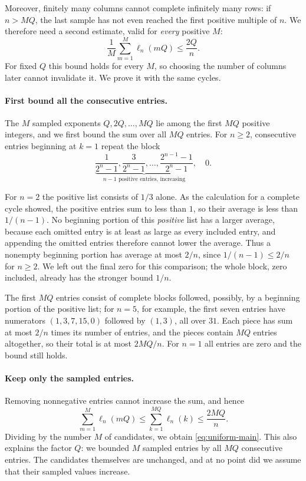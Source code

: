 \documentclass[10pt]{article}
\theoremstyle{plain}
\theoremstyle{definition}
\theoremstyle{remark}
\newcommand{\lft}{\ell}
\begin{document}
Moreover, finitely many columns cannot complete infinitely many rows:
if $n>MQ$, the last sample has not even reached the first positive
multiple of $n$. We therefore need a second estimate, valid for
\emph{every} positive $M$:
\begin{equation}\label{eq:uniform-main}
 \frac1M\sum_{m=1}^{M}\lft_n(mQ)\le\frac{2Q}{n}.
\end{equation}
For fixed $Q$ this bound holds for every $M$, so choosing the number
of columns later cannot invalidate it. We prove it with the same
cycles.

\paragraph{First bound all the consecutive entries.}
The $M$ sampled exponents $Q,2Q,\dots,MQ$ lie among the first $MQ$
positive integers, and we first bound the sum over all $MQ$ entries.
For $n\ge2$, consecutive entries beginning at $k=1$ repeat the block
\[
 \underbrace{\frac1{2^n-1},\frac3{2^n-1},\dots,
 \frac{2^{n-1}-1}{2^n-1}}_{n-1\text{ positive entries, increasing}},\quad 0.
\]
\begin{samepage}
For $n=2$ the positive list consists of $1/3$ alone. As the
calculation for a complete cycle showed, the positive entries sum to
less than $1$, so their average is less than $1/(n-1)$. No beginning
portion of this \emph{positive} list has a larger average, because each
omitted entry is at least as large as every included entry, and
appending the omitted entries therefore cannot lower the average. Thus
a nonempty beginning portion has average at most $2/n$, since
$1/(n-1)\le2/n$ for $n\ge2$. We left out the final zero for this
comparison; the whole block, zero included, already has the stronger
bound $1/n$.\par
\end{samepage}

The first $MQ$ entries consist of complete blocks followed, possibly,
by a beginning portion of the positive list; for $n=5$, for example, the
first seven entries have numerators $(1,3,7,15,0)$ followed by $(1,3)$,
all over $31$. Each piece has sum at most $2/n$ times its number of
entries, and the pieces contain $MQ$ entries altogether, so their total
is at most $2MQ/n$. For $n=1$ all entries are zero and the bound still
holds.

\paragraph{Keep only the sampled entries.}
Removing nonnegative entries cannot increase the sum, and hence
\[
 \sum_{m=1}^{M}\lft_n(mQ)
 \le\sum_{k=1}^{MQ}\lft_n(k)\le\frac{2MQ}{n}.
\]
Dividing by the number $M$ of candidates, we obtain
\eqref{eq:uniform-main}. This also explains the factor $Q$: we bounded
$M$ sampled entries by all $MQ$ consecutive entries. The candidates
themselves are unchanged, and at no point did we assume that their
sampled values increase.
\end{document}
